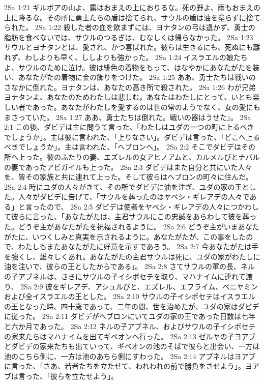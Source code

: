 2Sa 1:21  ギルボアの山よ、露はおまえの上におりるな。死の野よ、雨もおまえの上に降るな。その所に勇士たちの盾は捨てられ、サウルの盾は油を塗らずに捨てられた。
2Sa 1:22  殺した者の血を飲まずには、ヨナタンの弓は退かず、勇士の脂肪を食べないでは、サウルのつるぎは、むなしくは帰らなかった。
2Sa 1:23  サウルとヨナタンとは、愛され、かつ喜ばれた。彼らは生きるにも、死ぬにも離れず、わしよりも早く、ししよりも強かった。
2Sa 1:24  イスラエルの娘たちよ、サウルのために泣け。彼は緋色の着物をもって、はなやかにあなたがたを装い、あなたがたの着物に金の飾りをつけた。
2Sa 1:25  ああ、勇士たちは戦いのさなかに倒れた。ヨナタンは、あなたの高き所で殺された。
2Sa 1:26  わが兄弟ヨナタンよ、あなたのためわたしは悲しむ。あなたはわたしにとって、いとも楽しい者であった。あなたがわたしを愛するのは世の常のようでなく、女の愛にもまさっていた。
2Sa 1:27  ああ、勇士たちは倒れた。戦いの器はうせた」。
2Sa 2:1  この後、ダビデは主に問うて言った、「わたしはユダの一つの町に上るべきでしょうか」。主は彼に言われた、「上りなさい」。ダビデは言った、「どこへ上るべきでしょうか」。主は言われた、「ヘブロンへ」。
2Sa 2:2  そこでダビデはその所へ上った。彼のふたりの妻、エズレルの女アヒノアムと、カルメルびとナバルの妻であったアビガイルも上った。
2Sa 2:3  ダビデはまた自分と共にいた人々を、皆その家族と共に連れて上った。そして彼らはヘブロンの町々に住んだ。
2Sa 2:4  時にユダの人々がきて、その所でダビデに油を注ぎ、ユダの家の王とした。人々がダビデに告げて、「サウルを葬ったのはヤベシ・ギレアデの人々である」と言ったので、
2Sa 2:5  ダビデは使者をヤベシ・ギレアデの人々につかわして彼らに言った、「あなたがたは、主君サウルにこの忠誠をあらわして彼を葬った。どうぞ主があなたがたを祝福されるように。
2Sa 2:6  どうぞ主がいまあなたがたに、いつくしみと真実を示されるように。あなたがたが、この事をしたので、わたしもまたあなたがたに好意を示すであろう。
2Sa 2:7  今あなたがたは手を強くし、雄々しくあれ。あなたがたの主君サウルは死に、ユダの家がわたしに油を注いで、彼らの王としたからである」。
2Sa 2:8  さてサウルの軍の長、ネルの子アブネルは、さきにサウルの子イシボセテを取り、マハナイムに連れて渡り、
2Sa 2:9  彼をギレアデ、アシュルびと、エズレル、エフライム、ベニヤミンおよび全イスラエルの王とした。
2Sa 2:10  サウルの子イシボセテはイスラエルの王となった時、四十歳であって、二年の間、世を治めたが、ユダの家はダビデに従った。
2Sa 2:11  ダビデがヘブロンにいてユダの家の王であった日数は七年と六か月であった。
2Sa 2:12  ネルの子アブネル、およびサウルの子イシボセテの家来たちはマハナイムを出てギベオンへ行った。
2Sa 2:13  ゼルヤの子ヨアブとダビデの家来たちも出ていって、ギベオンの池のそばで彼らと出会い、一方は池のこちら側に、一方は池のあちら側にすわった。
2Sa 2:14  アブネルはヨアブに言った、「さあ、若者たちを立たせて、われわれの前で勝負をさせよう」。ヨアブは言った、「彼らを立たせよう」。
